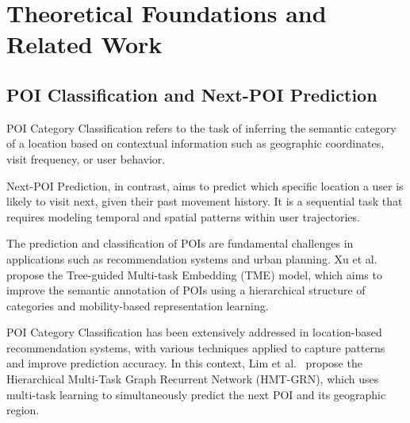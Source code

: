 \section{Theoretical Foundations and Related Work}
\label{sec:related}

%


\subsection{POI Classification and Next-POI Prediction}
POI Category Classification refers to the task of inferring the semantic category of a location based on contextual information such as geographic coordinates, visit frequency, or user behavior.

Next-POI Prediction, in contrast, aims to predict which specific location a user is likely to visit next, given their past movement history. It is a sequential task that requires modeling temporal and spatial patterns within user trajectories.

The prediction and classification of POIs are fundamental challenges in applications such as recommendation systems and urban planning. Xu et al.
~\cite{Xu2023} propose the Tree-guided Multi-task Embedding (TME) model, which aims to improve the semantic annotation of POIs using a hierarchical structure of categories and mobility-based representation learning. 

POI Category Classification has been extensively addressed in location-based recommendation systems, with various techniques applied to capture patterns and improve prediction accuracy. In this context, Lim et al.~\cite{Lim2022} propose the Hierarchical Multi-Task Graph Recurrent Network (HMT-GRN), which uses multi-task learning to simultaneously predict the next POI and its geographic region.

